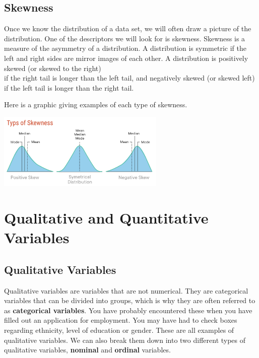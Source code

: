 \documentclass[
  letterpaper,
  DIV=11,
  numbers=noendperiod]{scrreprt}
\begin{document}
\section*{Skewness}\label{skewness}


Once we know the distribution of a data set, we will often draw a
picture of the distribution. One of the descriptors we will look for is
skewness. Skewness is a measure of the asymmetry of a distribution. A
distribution is symmetric if the left and right sides are mirror images
of each other. A distribution is positively skewed (or skewed to the
right)\\
if the right tail is longer than the left tail, and negatively skewed
(or skewed left) if the left tail is longer than the right tail.

Here is a graphic giving examples of each type of skewness.

\includegraphics[width=0.6\textwidth,height=\textheight]{./images/SL_2.jpg}


\chapter*{Qualitative and Quantitative
Variables}\label{qualitative-and-quantitative-variables}


\section*{Qualitative Variables}\label{qualitative-variables}


Qualitative variables are variables that are not numerical. They are
categorical variables that can be divided into groups, which is why they
are often referred to as \textbf{categorical variables}. You have
probably encountered these when you have filled out an application for
employment. You may have had to check boxes regarding ethnicity, level
of education or gender. These are all examples of qualitative variables.
We can also break them down into two different types of qualitative
variables, \textbf{nominal} and \textbf{ordinal} variables.
\end{document}
